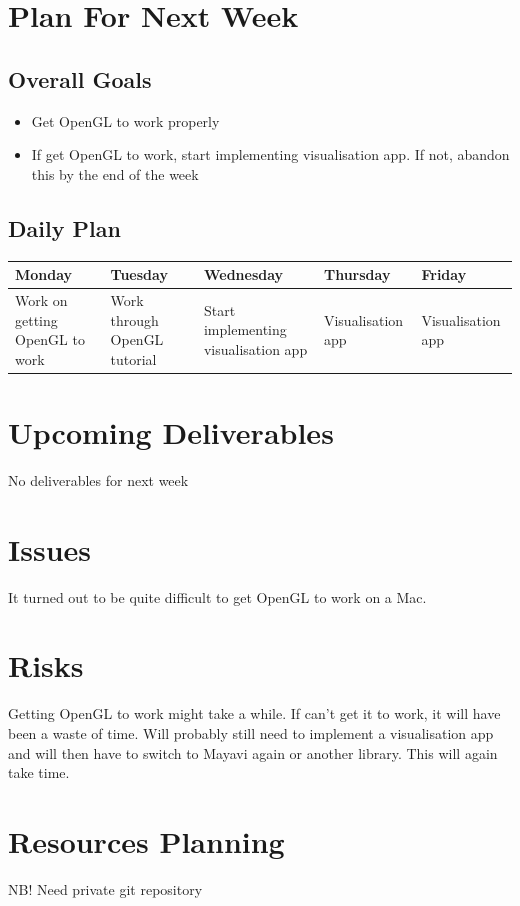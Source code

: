 \documentclass[12pt,notitlepage]{article}
\begin{document}
\section{Plan For Next Week}
\subsection{Overall Goals}
\begin{itemize}
	\item Get OpenGL to work properly
	\item If get OpenGL to work, start implementing visualisation app. If not, abandon this by the end of the week
\end{itemize}

\subsection{Daily Plan}
\begin{tabularx}{\textwidth}{X|X|X|X|X}
\textbf{Monday} & \textbf{Tuesday} & \textbf{Wednesday} & \textbf{Thursday} & \textbf{Friday} \\ \hline
Work on getting OpenGL to work & Work through OpenGL tutorial & Start implementing visualisation app & Visualisation app & Visualisation app \\ 
\end{tabularx}

\section{Upcoming Deliverables}
No deliverables for next week

\section{Issues}
It turned out to be quite difficult to get OpenGL to work on a Mac. 

\section{Risks}
Getting OpenGL to work might take a while. If can't get it to work, it will have been a waste of time. Will probably still need to implement a visualisation app and will then have to switch to Mayavi again or another library. This will again take time. 

\section{Resources Planning}
NB! Need private git repository
\end{document}
